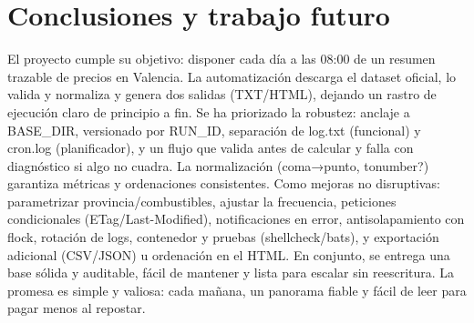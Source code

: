 \chapter{Conclusiones y trabajo futuro}

El proyecto cumple su objetivo: disponer cada día a las 08:00 de un resumen trazable de precios en Valencia. La automatización descarga el dataset oficial, lo valida y normaliza y genera dos salidas (TXT/HTML), dejando un rastro de ejecución claro de principio a fin.
Se ha priorizado la robustez: anclaje a BASE_DIR, versionado por RUN_ID, separación de log.txt (funcional) y cron.log (planificador), y un flujo que valida antes de calcular y falla con diagnóstico si algo no cuadra. La normalización (coma→punto, tonumber?) garantiza métricas y ordenaciones consistentes.
Como mejoras no disruptivas: parametrizar provincia/combustibles, ajustar la frecuencia, peticiones condicionales (ETag/Last-Modified), notificaciones en error, antisolapamiento con flock, rotación de logs, contenedor y pruebas (shellcheck/bats), y exportación adicional (CSV/JSON) u ordenación en el HTML.
En conjunto, se entrega una base sólida y auditable, fácil de mantener y lista para escalar sin reescritura. La promesa es simple y valiosa: cada mañana, un panorama fiable y fácil de leer para pagar menos al repostar.
